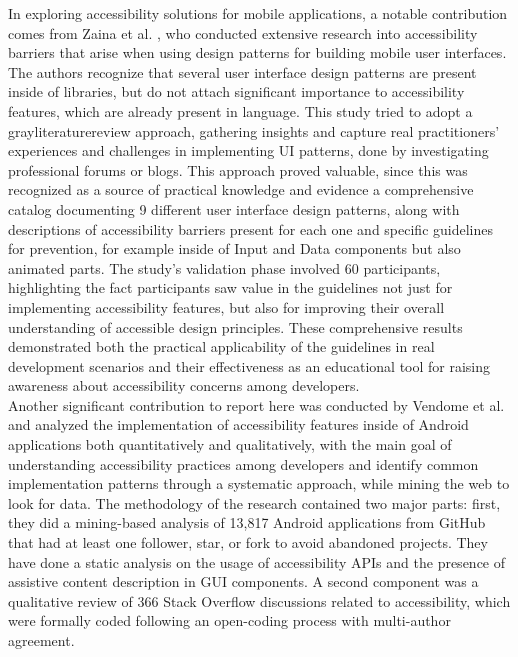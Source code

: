 In exploring accessibility solutions for mobile applications, a notable contribution comes from Zaina et al. \cite{zaina2022preventing}, who conducted extensive research into accessibility barriers that arise when using design patterns for building mobile user interfaces. The authors recognize that several user interface design patterns are present inside of libraries, but do not attach significant importance to accessibility features, which are already present in language. This study tried to adopt a \gls{grayliteraturereview} approach, gathering insights and capture real practitioners' experiences and challenges in implementing UI patterns, done by investigating professional forums or blogs. This approach proved valuable, since this was recognized as a source of practical knowledge and evidence a comprehensive catalog documenting 9 different user interface design patterns, along with descriptions of accessibility barriers present for each one and specific guidelines for prevention, for example inside of Input and Data components but also animated parts. The study's validation phase involved 60 participants, highlighting the fact participants saw value in the guidelines not just for implementing accessibility features, but also for improving their overall understanding of accessible design principles. These comprehensive results demonstrated both the practical applicability of the guidelines in real development scenarios and their effectiveness as an educational tool for raising awareness about accessibility concerns among developers.\\

Another significant contribution to report here was conducted by Vendome et al. \cite{vendome2019can} and analyzed the implementation of accessibility features inside of Android applications both quantitatively and qualitatively, with the main goal of understanding accessibility practices among developers and identify common implementation patterns through a systematic approach, while mining the web to look for data. The methodology of the research contained two major parts: first, they did a mining-based analysis of 13,817 Android applications from GitHub that had at least one follower, star, or fork to avoid abandoned projects. They have done a static analysis on the usage of accessibility APIs and the presence of assistive content description in GUI components. A second component was a qualitative review of 366 Stack Overflow discussions related to accessibility, which were formally coded following an open-coding process with multi-author agreement. \\

